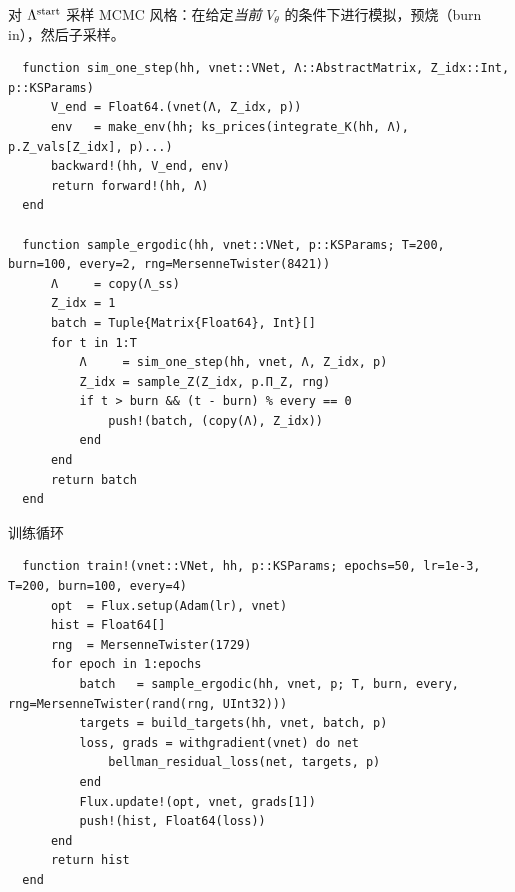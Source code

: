 \documentclass[10pt,aspectratio=169]{beamer}
\begin{document}
\begin{frame}[fragile]{对 $\Lambda^{\mathrm{start}}$ 采样}
  MCMC 风格：在给定\emph{当前} $V_\theta$ 的条件下进行模拟，预烧（burn in），然后子采样。

  \begin{lstlisting}
  function sim_one_step(hh, vnet::VNet, Λ::AbstractMatrix, Z_idx::Int, p::KSParams)
      V_end = Float64.(vnet(Λ, Z_idx, p))
      env   = make_env(hh; ks_prices(integrate_K(hh, Λ), p.Z_vals[Z_idx], p)...)
      backward!(hh, V_end, env)
      return forward!(hh, Λ)
  end

  function sample_ergodic(hh, vnet::VNet, p::KSParams; T=200, burn=100, every=2, rng=MersenneTwister(8421))
      Λ     = copy(Λ_ss)
      Z_idx = 1
      batch = Tuple{Matrix{Float64}, Int}[]
      for t in 1:T
          Λ     = sim_one_step(hh, vnet, Λ, Z_idx, p)
          Z_idx = sample_Z(Z_idx, p.Π_Z, rng)
          if t > burn && (t - burn) % every == 0
              push!(batch, (copy(Λ), Z_idx))
          end
      end
      return batch
  end
  \end{lstlisting}
\end{frame}

\begin{frame}[fragile]{训练循环}
  \begin{lstlisting}
  function train!(vnet::VNet, hh, p::KSParams; epochs=50, lr=1e-3, T=200, burn=100, every=4)
      opt  = Flux.setup(Adam(lr), vnet)
      hist = Float64[]
      rng  = MersenneTwister(1729)
      for epoch in 1:epochs
          batch   = sample_ergodic(hh, vnet, p; T, burn, every, rng=MersenneTwister(rand(rng, UInt32)))
          targets = build_targets(hh, vnet, batch, p)
          loss, grads = withgradient(vnet) do net
              bellman_residual_loss(net, targets, p)
          end
          Flux.update!(opt, vnet, grads[1])
          push!(hist, Float64(loss))
      end
      return hist
  end
  \end{lstlisting}
\end{frame}
\end{document}
